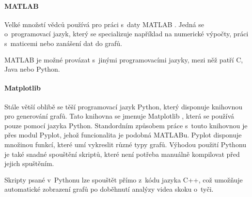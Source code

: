 \paragraph{MATLAB}

Velké množstí vědců používá pro práci s~daty MATLAB \citep{MATLAB}. Jedná se o~programovací jazyk, který se specializuje například na numerické výpočty, práci s~maticemi nebo zanášení dat do grafů.

MATLAB je možné provázat s~jinými programovacími jazyky, mezi něž patří C, Java nebo Python.

\paragraph{Matplotlib}

Stále větší oblibě se těší programovací jazyk Python, který disponuje knihovnou pro generování grafů. Tato knihovna se jmenuje Matplotlib \citep{Matplotlib}, která se používá pouze pomocí jazyka Python. Standordním způsobem práce s~touto knihovnou je přes modul Pyplot, jehož funcionalita je podobná MATLABu. Pyplot disponuje množinou funkcí, které umí vykreslit různé typy grafů. Výhodou použití Pythonu je také snadné spouštění skriptů, které není potřeba manuálně kompilovat před jejich spuštěním.

Skripty psané v~Pythonu lze spouštět přímo z~kódu jazyka C++, což umožňuje automatické zobrazení grafů po doběhnutí analýzy videa skoku o~tyči.

































